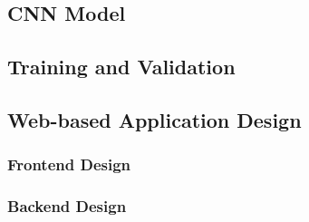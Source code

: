 \documentclass{BachelorBUI}
\begin{document}
    \subsection{CNN Model} %
    \subsection{Training and Validation}
    \subsection{Web-based Application Design}
        \subsubsection{Frontend Design}
        \subsubsection{Backend Design}
\end{document}

